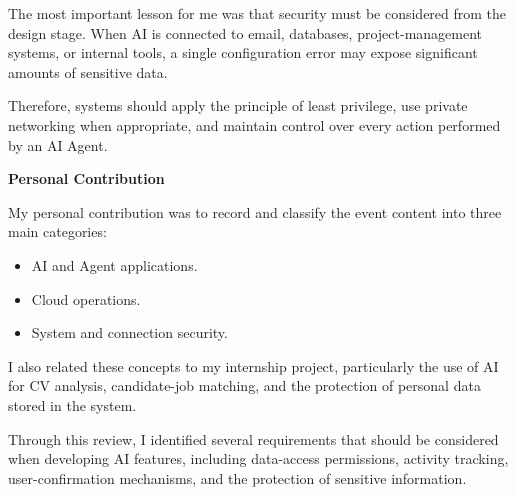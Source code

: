 The most important lesson for me was that security must be considered
from the design stage. When AI is connected to email, databases,
project-management systems, or internal tools, a single configuration
error may expose significant amounts of sensitive data.

Therefore, systems should apply the principle of least privilege, use
private networking when appropriate, and maintain control over every
action performed by an AI Agent.

\vspace{0.5em}\noindent\textbf{Personal Contribution}\par

My personal contribution was to record and classify the event content
into three main categories:

\begin{itemize}
\tightlist
\item
  AI and Agent applications.
\item
  Cloud operations.
\item
  System and connection security.
\end{itemize}

I also related these concepts to my internship project, particularly the
use of AI for CV analysis, candidate-job matching, and the protection of
personal data stored in the system.

Through this review, I identified several requirements that should be
considered when developing AI features, including data-access
permissions, activity tracking, user-confirmation mechanisms, and the
protection of sensitive information.
